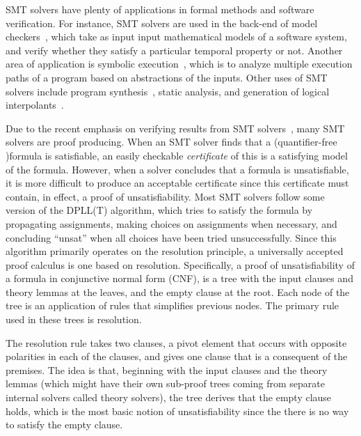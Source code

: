 \documentclass{article}
\begin{document}
	SMT solvers have plenty of applications in formal methods 
	and software verification. For instance, SMT solvers are used 
	in the back-end of model checkers~\cite{DBLP:books/daglib/0020348}, 
	which take as input input mathematical 
	models of a software system, and verify whether they 
	satisfy a particular temporal property or not. Another area of application is symbolic
	execution~\cite{DBLP:journals/csur/BaldoniCDDF18}, 
	which is to analyze multiple execution paths of a program 
	based on abstractions of the inputs. Other uses of
	SMT solvers include program synthesis~\cite{synth}, 
	static analysis, and generation of logical interpolants~\cite{DBLP:journals/corr/abs-1111-5652}.
	
	Due to the recent emphasis on verifying results from SMT solvers~\cite{10.1145/1670412.1670413,
	mansur2020detecting, 10.1007/978-3-642-38916-0_3},
	many SMT solvers are proof producing. When an 
	SMT solver finds that a (quantifier-free )formula is satisfiable, an easily checkable \emph{certificate} 
	of this is a satisfying model of the formula.
	However, when a solver 
	concludes that a formula is unsatisfiable, it is more difficult 
	to produce an acceptable certificate since this 
	certificate must contain, in effect, a proof of unsatisfiability. Most SMT solvers 
	follow some version of the DPLL(T) algorithm, which tries
	to satisfy the formula by propagating assignments, making 
	choices on assignments when necessary, and concluding ``unsat''
	when all choices have been tried unsuccessfully. 
	Since this algorithm 
	primarily operates on the resolution principle, 
	a universally accepted proof calculus is one based 
	on resolution. Specifically, a proof of unsatisfiability 
	of a formula in conjunctive normal form (CNF), is a tree 
	with the input clauses and theory lemmas at the leaves, 
	and the empty clause at the root. Each node of the 
	tree is an application of rules that simplifies previous 
	nodes. The primary rule used in these trees is 
	resolution.
	
	The resolution rule takes two clauses, a pivot element 
	that occurs with opposite polarities in each of the 
	clauses, and gives one clause that is a consequent 
	of the premises. The idea is that, beginning 
	with the input clauses and the theory lemmas (which might 
	have their own sub-proof trees coming from separate 
	internal solvers called theory solvers), 
	the tree derives that the empty clause holds, which is the 
	most basic notion of unsatisfiability since the there 
	is no way to satisfy the empty clause.
	
\end{document}

